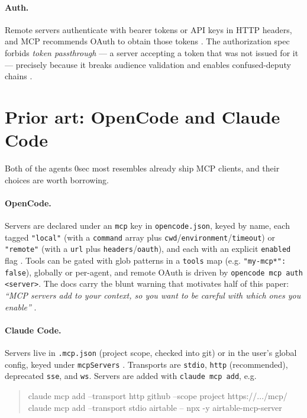 \documentclass[11pt]{article}
\begin{document}
\paragraph{Auth.} Remote servers authenticate with bearer tokens or API keys in
HTTP headers, and MCP recommends OAuth to obtain those tokens
\cite{mcp-arch,mcp-security}. The authorization spec forbids
\emph{token passthrough} --- a server accepting a token that was not issued for
it --- precisely because it breaks audience validation and enables confused-deputy
chains \cite{mcp-security}.

\section{Prior art: OpenCode and Claude Code}

Both of the agents 0sec most resembles already ship MCP clients, and their
choices are worth borrowing.

\paragraph{OpenCode.} Servers are declared under an \texttt{mcp} key in
\texttt{opencode.json}, keyed by name, each tagged \texttt{"local"} (with a
\texttt{command} array plus \texttt{cwd}/\texttt{environment}/\texttt{timeout}) or
\texttt{"remote"} (with a \texttt{url} plus \texttt{headers}/\texttt{oauth}), and
each with an explicit \texttt{enabled} flag \cite{opencode-mcp}. Tools can be
gated with glob patterns in a \texttt{tools} map (e.g. \texttt{"my-mcp*": false}),
globally or per-agent, and remote OAuth is driven by
\texttt{opencode mcp auth <server>}. The docs carry the blunt warning that
motivates half of this paper: \emph{``MCP servers add to your context, so you
want to be careful with which ones you enable''} \cite{opencode-mcp}.

\paragraph{Claude Code.} Servers live in \texttt{.mcp.json} (project scope,
checked into git) or in the user's global config, keyed under
\texttt{mcpServers} \cite{claudecode-mcp}. Transports are \texttt{stdio},
\texttt{http} (recommended), deprecated \texttt{sse}, and \texttt{ws}. Servers
are added with \texttt{claude mcp add}, e.g.

\begin{quote}
\ttfamily
claude mcp add --transport http github --scope project https://.../mcp/\\
claude mcp add --transport stdio airtable -- npx -y airtable-mcp-server
\end{quote}
\end{document}
